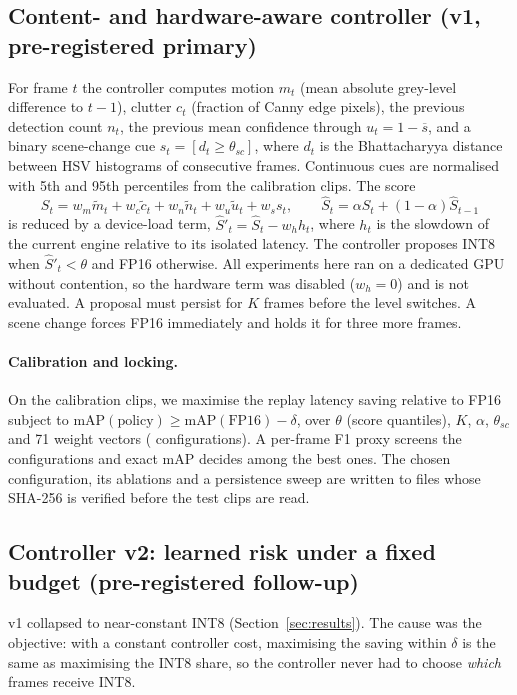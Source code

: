 \documentclass[pdflatex,sn-mathphys-num]{sn-jnl}
\begin{document}
\subsection{Content- and hardware-aware controller (v1, pre-registered primary)}
For frame $t$ the controller computes motion $m_t$ (mean absolute grey-level difference to $t-1$), clutter $c_t$ (fraction of Canny edge pixels), the previous detection count $n_t$, the previous mean confidence through $u_t = 1-\overline{s}$, and a binary scene-change cue $s_t = [d_t \geq \theta_{sc}]$, where $d_t$ is the Bhattacharyya distance between HSV histograms of consecutive frames. Continuous cues are normalised with 5th and 95th percentiles from the calibration clips. The score
\begin{equation}
S_t = w_m \tilde m_t + w_c \tilde c_t + w_n \tilde n_t + w_u \tilde u_t + w_s s_t, \qquad \hat S_t = \alpha S_t + (1-\alpha)\hat S_{t-1}
\end{equation}
is reduced by a device-load term, $\hat S'_t = \hat S_t - w_h h_t$, where $h_t$ is the slowdown of the current engine relative to its isolated latency. The controller proposes INT8 when $\hat S'_t < \theta$ and FP16 otherwise. All experiments here ran on a dedicated GPU without contention, so the hardware term was disabled ($w_h = 0$) and is not evaluated. A proposal must persist for $K$ frames before the level switches. A scene change forces FP16 immediately and holds it for three more frames.

\paragraph{Calibration and locking.} On the calibration clips, we maximise the replay latency saving relative to FP16 subject to $\mathrm{mAP}(\text{policy}) \geq \mathrm{mAP}(\text{FP16}) - \delta$, over $\theta$ (score quantiles), $K$, $\alpha$, $\theta_{sc}$ and 71 weight vectors (\CalibConfigs{} configurations). A per-frame F1 proxy screens the configurations and exact mAP decides among the best ones. The chosen configuration, its ablations and a persistence sweep are written to files whose SHA-256 is verified before the test clips are read.

\subsection{Controller v2: learned risk under a fixed budget (pre-registered follow-up)}
v1 collapsed to near-constant INT8 (Section~\ref{sec:results}). The cause was the objective: with a constant controller cost, maximising the saving within $\delta$ is the same as maximising the INT8 share, so the controller never had to choose \emph{which} frames receive INT8.
\end{document}

